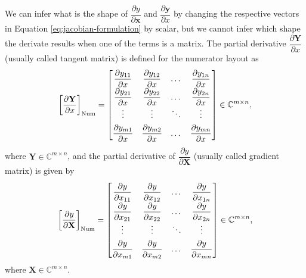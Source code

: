 \documentclass{article}
\begin{document}
We can infer what is the shape of \(\dfrac{\partial y}{\partial \mathbf{x}}\) and \(\dfrac{\partial \mathbf{y}}{\partial x}\) by changing the respective vectors in Equation \eqref{eq:jacobian-formulation} by scalar, but we cannot infer which shape the derivate results when one of the terms is a matrix. The partial derivative \(\dfrac{\partial \mathbf{Y}}{\partial x}\) (usually called tangent matrix) is defined for the numerator layout as
\begin{align}
    \left[\dfrac{\partial \mathbf{Y}}{\partial x}\right]_{\textnormal{Num}} \renewcommand{\arraystretch}{1.8} = \begin{bmatrix}
        \dfrac{\partial y_{11}}{\partial x} & \dfrac{\partial y_{12}}{\partial x} & \dots & \dfrac{\partial y_{1n}}{\partial x} \\
        \dfrac{\partial y_{21}}{\partial x} & \dfrac{\partial y_{22}}{\partial x} & \dots & \dfrac{\partial y_{2n}}{\partial x} \\
        \vdots & \vdots & \ddots & \vdots \\
        \dfrac{\partial y_{m1}}{\partial x} & \dfrac{\partial y_{m2}}{\partial x} & \dots & \dfrac{\partial y_{mn}}{\partial x} \\
    \end{bmatrix} \in \mathbb{C}^{m \times n},
\end{align}
where \(\mathbf{Y} \in \mathbb{C}^{m \times n}\), and the partial derivative of \(\dfrac{\partial y}{\partial \mathbf{X}}\) (usually called gradient matrix) is given by
\begin{align}
    \label{eq:gradient-matrix-num}
    \renewcommand{\arraystretch}{1.8}
			\left[\dfrac{\partial y}{\partial \mathbf{X}}\right]_{\textnormal{Num}} = \begin{bmatrix}
				\dfrac{\partial y}{\partial x_{11}} & \dfrac{\partial y}{\partial x_{12}} & \dots & \dfrac{\partial y}{\partial x_{1n}} \\
				\dfrac{\partial y}{\partial x_{21}} & \dfrac{\partial y}{\partial x_{22}} & \dots & \dfrac{\partial y}{\partial x_{2n}} \\
				\vdots & \vdots & \ddots & \vdots \\
				\dfrac{\partial y}{\partial x_{m1}} & \dfrac{\partial y}{\partial x_{m2}} & \dots & \dfrac{\partial y}{\partial x_{mn}} \\
			\end{bmatrix} \in \mathbb{C}^{m \times n},
\end{align}
where \(\mathbf{X} \in \mathbb{C}^{m \times n}\).
\end{document}
